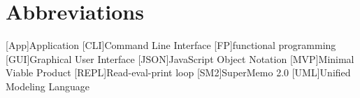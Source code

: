 \chapter{Abbreviations}\label{a:Abbreviations}

\begin{acronym}

    [App]{Application}
    [CLI]{Command Line Interface}
    [FP]{functional programming}
    [GUI]{Graphical User Interface}
    [JSON]{JavaScript Object Notation}
    [MVP]{Minimal Viable Product}
    [REPL]{Read-eval-print loop}
    [SM2]{SuperMemo 2.0}
    [UML]{Unified Modeling Language}

\end{acronym}